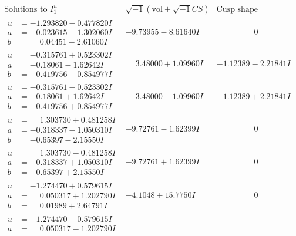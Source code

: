 \documentclass[1p]{elsarticle_modified}
\theoremstyle{definition}
\newcommand{\I}{\sqrt{-1}}
\begin{document}
$$\begin{array}{c|c|c}
\text{Solutions to }I^u_{1}& \I (\text{vol} + \sqrt{-1}CS) & \text{Cusp shape}\\
 \hline 
\begin{aligned}
u &= -1.293820 - 0.477820 I \\
a &= -0.023615 - 1.302060 I \\
b &= \phantom{-}0.04451 - 2.61060 I\end{aligned}
 & -9.73955 - 8.61640 I & \phantom{-0.000000 } 0 \\ \hline\begin{aligned}
u &= -0.315761 + 0.523302 I \\
a &= -0.18061 - 1.62642 I \\
b &= -0.419756 - 0.854977 I\end{aligned}
 & \phantom{-}3.48000 + 1.09960 I & -1.12389 - 2.21841 I \\ \hline\begin{aligned}
u &= -0.315761 - 0.523302 I \\
a &= -0.18061 + 1.62642 I \\
b &= -0.419756 + 0.854977 I\end{aligned}
 & \phantom{-}3.48000 - 1.09960 I & -1.12389 + 2.21841 I \\ \hline\begin{aligned}
u &= \phantom{-}1.303730 + 0.481258 I \\
a &= -0.318337 - 1.050310 I \\
b &= -0.65397 - 2.15550 I\end{aligned}
 & -9.72761 - 1.62399 I & \phantom{-0.000000 } 0 \\ \hline\begin{aligned}
u &= \phantom{-}1.303730 - 0.481258 I \\
a &= -0.318337 + 1.050310 I \\
b &= -0.65397 + 2.15550 I\end{aligned}
 & -9.72761 + 1.62399 I & \phantom{-0.000000 } 0 \\ \hline\begin{aligned}
u &= -1.274470 + 0.579615 I \\
a &= \phantom{-}0.050317 + 1.202790 I \\
b &= \phantom{-}0.01989 + 2.64791 I\end{aligned}
 & -4.1048 + 15.7750 I & \phantom{-0.000000 } 0 \\ \hline\begin{aligned}
u &= -1.274470 - 0.579615 I \\
a &= \phantom{-}0.050317 - 1.202790 I \\

\end{aligned}
\end{array}$$
\end{document}
